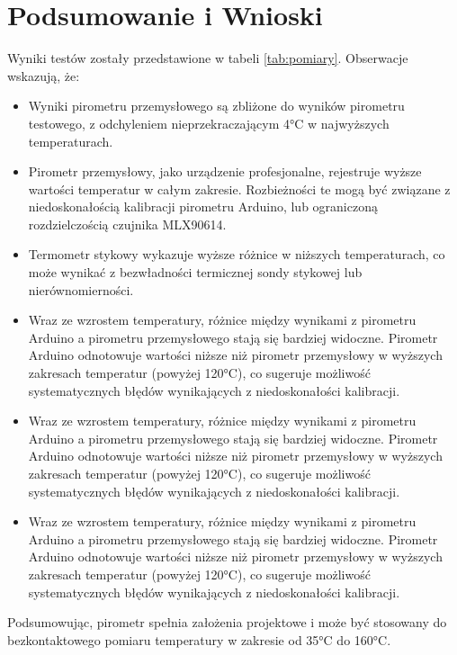 \chapter{Podsumowanie i Wnioski}

Wyniki testów zostały przedstawione w tabeli \ref{tab:pomiary}. Obserwacje wskazują, że:
\begin{itemize}
\item Wyniki pirometru przemysłowego są zbliżone do wyników pirometru testowego, z odchyleniem nieprzekraczającym 4°C w najwyższych temperaturach.
\item Pirometr przemysłowy, jako urządzenie profesjonalne, rejestruje wyższe wartości
temperatur w całym zakresie. Rozbieżności te mogą być związane z niedoskonałością
kalibracji pirometru Arduino, lub ograniczoną rozdzielczością czujnika MLX90614.
\item Termometr stykowy wykazuje wyższe różnice w niższych temperaturach, co
może wynikać z bezwładności termicznej sondy stykowej lub nierównomierności.\item Wraz ze wzrostem temperatury, różnice między wynikami z pirometru Arduino
a pirometru przemysłowego stają się bardziej widoczne. Pirometr Arduino
odnotowuje wartości niższe niż pirometr przemysłowy w wyższych zakresach
temperatur (powyżej 120°C), co sugeruje możliwość systematycznych błędów
wynikających z niedoskonałości kalibracji. \item Wraz ze wzrostem temperatury, różnice między wynikami z pirometru Arduino a pirometru przemysłowego stają się bardziej widoczne. Pirometr Arduino
odnotowuje wartości niższe niż pirometr przemysłowy w wyższych zakresach
temperatur (powyżej 120°C), co sugeruje możliwość systematycznych błędów
wynikających z niedoskonałości kalibracji.
\item Wraz ze wzrostem temperatury, różnice między wynikami z pirometru Arduino
a pirometru przemysłowego stają się bardziej widoczne. Pirometr Arduino
odnotowuje wartości niższe niż pirometr przemysłowy w wyższych zakresach
temperatur (powyżej 120°C), co sugeruje możliwość systematycznych błędów
wynikających z niedoskonałości kalibracji.
\end{itemize}

Podsumowując, pirometr spełnia założenia projektowe i może być stosowany do bezkontaktowego pomiaru temperatury w zakresie od 35°C do 160°C.

